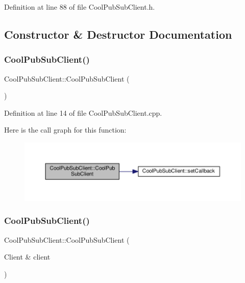 Definition at line 88 of file Cool\+Pub\+Sub\+Client.\+h.



\subsection{Constructor \& Destructor Documentation}
\mbox{\label{class_cool_pub_sub_client_a2e54e36217bb0969b91b5dee9a27410f}} 
\subsubsection{\texorpdfstring{Cool\+Pub\+Sub\+Client()}{CoolPubSubClient()}\hspace{0.1cm}{\footnotesize\ttfamily [1/14]}}
{\footnotesize\ttfamily Cool\+Pub\+Sub\+Client\+::\+Cool\+Pub\+Sub\+Client (\begin{DoxyParamCaption}{ }\end{DoxyParamCaption})}



Definition at line 14 of file Cool\+Pub\+Sub\+Client.\+cpp.

Here is the call graph for this function\+:\nopagebreak
\begin{figure}[H]
\begin{center}
\leavevmode
\includegraphics[width=350pt]{class_cool_pub_sub_client_a2e54e36217bb0969b91b5dee9a27410f_cgraph}
\end{center}
\end{figure}
\mbox{\label{class_cool_pub_sub_client_a0563a12cb4e9339bf2605cfc655e717d}} 
\subsubsection{\texorpdfstring{Cool\+Pub\+Sub\+Client()}{CoolPubSubClient()}\hspace{0.1cm}{\footnotesize\ttfamily [2/14]}}
{\footnotesize\ttfamily Cool\+Pub\+Sub\+Client\+::\+Cool\+Pub\+Sub\+Client (\begin{DoxyParamCaption}\item[{Client \&}]{client }\end{DoxyParamCaption})}



